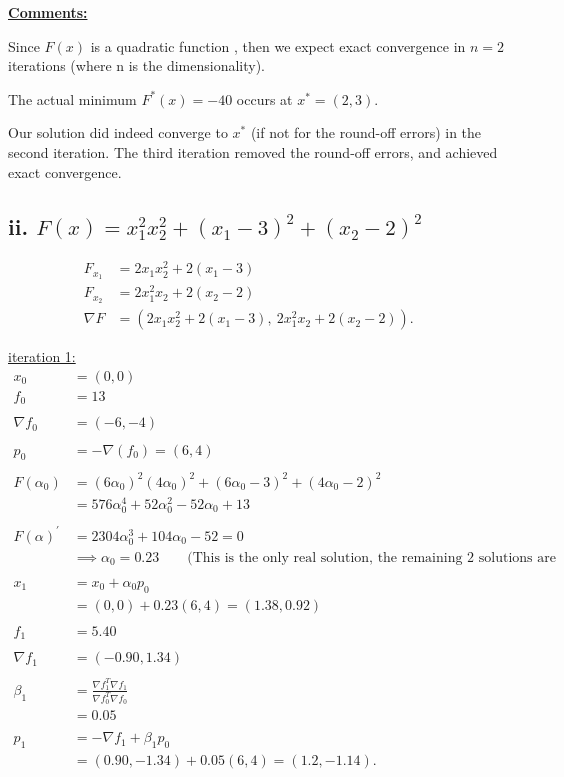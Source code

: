 \documentclass{article}
\begin{document}
\noindent
\textbf{\underline{Comments:}} 

Since $F(x)$ is a quadratic function , then we expect exact convergence in $n = 2$ iterations (where n is the dimensionality).

The actual minimum $F^*(x)= -40$ occurs at $x^* = (2, 3)$.

Our solution did indeed converge to $x^*$ (if not for the round-off errors) in the second iteration. The third iteration removed the round-off errors, and achieved exact convergence.
\newline
\newline

\subsection*{ii. \underline{$F(x) = x_1^2 x_2^2 + (x_1 - 3)^2 + (x_2 - 2)^2$}}

\begin{align*}
  F_{x_1} &= 2x_1 x_2^2 + 2(x_1 - 3) &&\\ 
  F_{x_2} &= 2x_1^2 x_2 + 2(x_2 - 2) &&\\
  \nabla F &= (2x_1 x_2^2 + 2(x_1 - 3), \: 2x_1^2 x_2 + 2(x_2 - 2)).
\end{align*}

\noindent
\underline{iteration 1:}
\begin{align*}
  x_0 &= (0, 0) &&\\
  f_0 &= 13 &&\\
  &&\\
  \nabla f_0 &= (-6, -4) &&\\
  &&\\
  p_0 &= -\nabla(f_0) = (6, 4) &&\\
  &&\\
  F(\alpha_0) 
  &= (6\alpha_0)^2(4\alpha_0)^2 + (6\alpha_0 -3)^2 + (4\alpha_0 -2)^2 &&\\
  &= 576 \alpha_0^4 + 52 \alpha_0^2 - 52\alpha_0 + 13 &&\\
  &&\\
  F(\alpha)^\prime &= 2304 \alpha_0^3 + 104 \alpha_0 - 52 = 0 &&\\
  &\implies \alpha_0 = 0.23 \qquad \text{(This is the only real solution, the remaining 2 solutions are complex.)} &&\\
  &&\\
  x_{1} &= x_0 + \alpha_0 p_0 &&\\
  &= (0, 0) + 0.23 (6, 4) = (1.38, 0.92) &&\\
  &&\\
  f_1 &= 5.40 &&\\
  &&\\
  \nabla f_1 &=  (-0.90, 1.34) &&\\
  &&\\
  \beta_{1} &= \frac{\nabla f_1^T \nabla f_1}{\nabla f_0^T \nabla f_0} &&\\
  &= 0.05 &&\\
  &&\\
  p_1 &= -\nabla f_1 + \beta_1 p_0 &&\\
  &= (0.90, -1.34) + 0.05 (6, 4) = (1.2, -1.14).
\end{align*}
\newline
\end{document}
